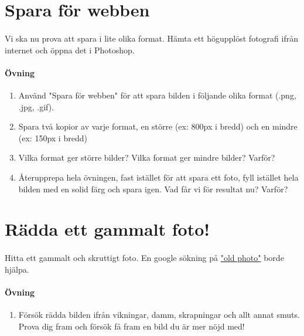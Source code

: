 \documentclass{article}
\begin{document}
  \section{Spara för webben}
    \paragraph{}
    Vi ska nu prova att spara i lite olika format. Hämta ett högupplöst fotografi ifrån internet och öppna det i Photoshop.

    \paragraph{Övning}
      \begin{enumerate}
        \item Använd "Spara för webben" för att spara bilden i följande olika format (.png, .jpg, .gif).
        \item Spara två kopior av varje format, en större (ex: 800px i bredd) och en mindre (ex: 150px i bredd)
        \item Vilka format ger större bilder? Vilka format ger mindre bilder? Varför?
        \item Återupprepa hela övningen, fast istället för att spara ett foto, fyll istället hela bilden med en solid färg och spara igen. Vad får vi för resultat nu? Varför?
      \end{enumerate}


  \section{Rädda ett gammalt foto!}
    \paragraph{}
    Hitta ett gammalt och skruttigt foto. En google sökning på \href{https://www.google.se/search?biw=1680&bih=882&q=dusty+old+photo&bav=on.2,or.r_qf.&bvm=bv.51495398,d.ZG4,pv.xjs.s.en_US.M4-36_38X9A.O&um=1&ie=UTF-8&hl=sv&tbm=isch&source=og&sa=N&tab=wi&ei=cKEkUuzdHYGVhQeytYC4Bw#hl=sv&q=old+photograph&tbm=isch&um=1}{"old photo"} borde hjälpa.
    
    \paragraph{Övning}
      \begin{enumerate}
        \item Försök rädda bilden ifrån vikningar, damm, skrapningar och allt annat smuts. Prova dig fram och försök få fram en bild du är mer nöjd med!
      \end{enumerate} 
\end{document}
